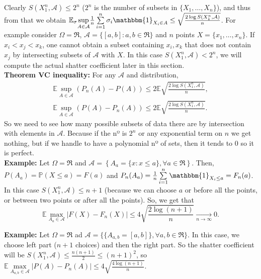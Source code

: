 \documentclass[11pt, english]{article}
\begin{document}
 Clearly $S(X_1^n,\mathcal{A})\leq 2^n$ ($2^n$ is the number of subsets in $\{X_1,\dots,X_n\}$), and thus from that we obtain $\mathbb{E}_{\sigma}\underset{A\in\mathcal{A}}{\sup}\frac{1}{n}\sum\limits_{i=1}^n\sigma_i\mathbbm{1}_{X_i\in A}\leq \sqrt{\frac{2\log S(X_1^n,\mathcal{A})}{n}}$.
 For example consider $\Omega=\Re$, $\mathcal{A}=\{[a,b]:a,b\in\Re\}$ and $n$ points $X=\{x_1,\dots,x_n\}$. If $x_i<x_j<x_k$, one cannot obtain a subset containing $x_i, x_k$ that does not contain $x_j$ by intersecting subsets of $\mathcal{A}$ with $X$. In this case $S(X_1^n,\mathcal{A})<2^n$, we will compute the actual shatter coefficient later in this section.\\
 
 \textbf{Theorem VC inequality:} For any $\mathcal{A}$ and distribution, \begin{align}
 	\mathbb{E}\underset{A\in\mathcal{A}}{\sup}(P_n(A)-P(A))\leq 2\mathbb{E}\sqrt{\frac{2\log S(X_1^n,\mathcal{A})}{n}},\\
 	\mathbb{E}\underset{A\in\mathcal{A}}{\sup}(P(A)-P_n(A))\leq 2\mathbb{E}\sqrt{\frac{2\log S(X_1^n,\mathcal{A})}{n}}.
 \end{align}
 So we need to see how many possible subsets of data there are by intersection with elements in $\mathcal{A}$. Because if the nº is $2^n$ or any exponential term on $n$ we get nothing, but if we handle to have a polynomial nº of sets, then it tends to 0 so it is perfect.\\
 
 \textbf{Example:}
 Let $\Omega= \Re$ and $\mathcal{A}=\left\{A_a=\{x: x\leq a\}, \forall a\in\Re\right\}$. Then, $P(A_a)=\mathbb{P}(X\leq a)=F(a)$ and $P_n(A_a)=\frac{1}{n}\sum\limits_{i=1}^n\mathbbm{1}_{X_i\leq a}=F_n(a)$. In this case $S(X_1^n,\mathcal{A})\leq n+1$ (because we can choose $a$ or before all the points, or between two points or after all the points). So, we get that 
 \begin{equation}
 	\mathbb{E}\underset{A_a\in\mathcal{A}}{\max}|F(X)-F_n(X)|\leq 4\sqrt{\frac{2\log(n+1)}{n}}\underset{n\rightarrow\infty}{\longrightarrow}0.
 \end{equation}
 
 \textbf{Example:} Let $\Omega=\Re$ ad $\mathcal{A}=\{\{A_{a,b}=[a,b]\},\forall a,b\in\Re \}$. In this case, we choose left part ($n+1$ choices) and then the right part. So the shatter coefficient will be $S(X_1^n,\mathcal{A})\leq\frac{n(n+1)}{2}\leq(n+1)^2$, so $\mathbb{E}\underset{A_{a,b}\in\mathcal{A}}{\max}|P(A)-P_n(A)|\leq4\sqrt{\frac{4\log(n+1)}{n}}$.\\
 
\end{document}
